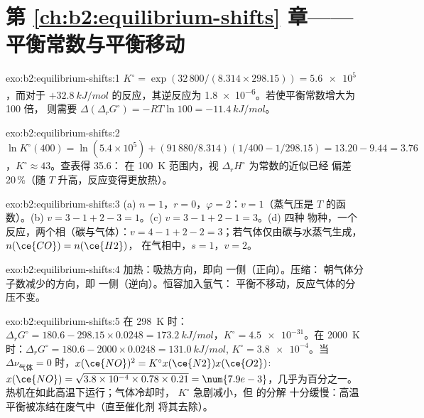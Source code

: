 \section*{第 \ref{ch:b2:equilibrium-shifts} 章——平衡常数与平衡移动}

\begin{solution}{exo:b2:equilibrium-shifts:1}
$K^\circ = \exp(32\,800/(8.314 \times 298.15)) = \num{5.6e5}$，而对于
$+\qty{32.8}{kJ/mol}$ 的反应，其逆反应为 \num{1.8e-6}。若使平衡常数增大为 100 倍，
则需要 $\Delta(\Delta_r G^\circ) = -RT\ln 100 = \qty{-11.4}{kJ/mol}$。
\end{solution}

\begin{solution}{exo:b2:equilibrium-shifts:2}
$\ln K^\circ(400) = \ln(5.4 \times 10^5) + (91\,880/8.314)(1/400 -
1/298.15) = 13.20 - 9.44 = 3.76$，$K^\circ \approx 43$。查表得 35.6：
在 \qty{100}{K} 范围内，视 $\Delta_r H^\circ$ 为常数的近似已经
偏差 20\,\%（随 $T$ 升高，反应变得更放热）。
\end{solution}

\begin{solution}{exo:b2:equilibrium-shifts:3}
(a) $n = 1$，$r = 0$，$\varphi = 2$：$v = 1$（蒸气压是
$T$ 的函数）。(b) $v = 3 - 1 + 2 - 3 = 1$。(c) $v = 3 - 1 + 2 - 1 = 3$。(d) 四种
物种，一个反应，两个相（碳与气体）：$v = 4 - 1 + 2 - 2 =
3$；若气体仅由碳与水蒸气生成，$n(\ce{CO}) = n(\ce{H2})$，
在气相中，$s = 1$，$v = 2$。
\end{solution}

\begin{solution}{exo:b2:equilibrium-shifts:4}
加热：吸热方向，即向  一侧（正向）。压缩：
朝气体分子数减少的方向，即  一侧（逆向）。恒容加入氩气：
平衡不移动，反应气体的分压不变。
\end{solution}

\begin{solution}{exo:b2:equilibrium-shifts:5}
在 \qty{298}{K} 时：$\Delta_r G^\circ = 180.6 - 298.15 \times 0.0248 =
\qty{173.2}{kJ/mol}$，$K^\circ = \num{4.5e-31}$。在 \qty{2000}{K} 时：$\Delta_r
G^\circ = 180.6 - 2000 \times 0.0248 = \qty{131.0}{kJ/mol}$, $K^\circ =
\num{3.8e-4}$。当 $\Delta\nu_{\text{气体}} = 0$ 时，$x(\ce{NO})^2 = K^\circ x(\ce{N2})
x(\ce{O2})$: $x(\ce{NO}) = \sqrt{3.8 \times 10^{-4} \times 0.78 \times 0.21} =
\num{7.9e-3}$，几乎为百分之一。热机在如此高温下运行；气体冷却时，
$K^\circ$ 急剧减小，但  的分解
十分缓慢：高温平衡被冻结在废气中（直至催化剂
将其去除）。
\end{solution}

